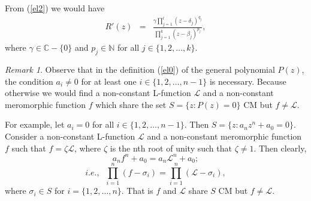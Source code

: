 \documentclass[a4paper,draft]{amsproc}
\theoremstyle{plain}
\theoremstyle{definition}
\theoremstyle{remark}
\newtheorem{rem}{Remark}[section]
\newcommand{\bea}{\begin{eqnarray}}
\newcommand{\eea}{\end{eqnarray}}
\numberwithin{equation}{section}
\begin{document}
From (\ref{el2}) we would have 
\bea \label{el3} R'(z)&=&\frac{\gamma\prod\limits_{j=1}^{l}(z-\delta_j)^{q_{j}}}{\prod\limits_{j=1}^{k}(z-\beta_j)^{p_{j}}},\eea where $\gamma\in\mathbb{C}-\{0\}$ and $p_{j}\in\mathbb{N}$ for all $j\in\{1,2,\ldots,k\}$. %
\begin{rem}
	Observe that in the definition (\ref{el0}) of the general polynomial $P(z)$, the condition $a_{i}\neq 0$ for at least one $i\in \{1,2,\ldots,n-1\}$ is necessary. Because otherwise we would find a non-constant L-function $\mathcal{L}$ and a non-constant meromorphic function $f$ which share the set $S=\{z:P(z)=0\}$ CM but $f\neq \mathcal{L}$.
	\par  For example, let  $a_{i}=0$ for all $i\in \{1,2,\ldots,n-1\}$. Then $S=\{z: a_{n}z^{n}+a_{0}=0\}$. Consider a non-constant L-function $\mathcal{L}$ and  a non-constant meromorphic function $f$ such that $f=\zeta\mathcal{L}$, where $\zeta$ is the nth root of unity such that $\zeta \ne 1 $. Then clearly, $$a_{n}f^{n}+a_{0}=a_{n}\mathcal{L}^{n}+a_{0};$$ $$i.e.,\;\; \prod\limits_{i=1}^{n}(f-\sigma_{i})=\prod\limits_{i=1}^{n}(\mathcal{L}-\sigma_{i}),$$ where $\sigma_{i}\in S$ for $i=\{1,2,\ldots,n\}$. That is $f$ and $\mathcal{L}$ share $S$ CM but $f\ne \mathcal{L}$.
\end{rem}  
\end{document}
